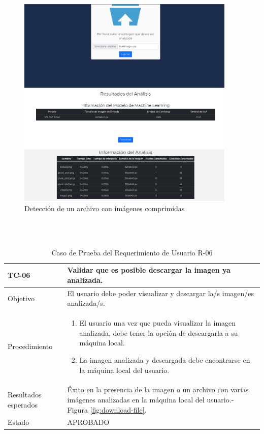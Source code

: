 \begin{figure}[h!]
    \centering
    \includegraphics[width=0.93\textwidth]{img/FE - bulk detection.png}
    \caption{Detección de un archivo con imágenes comprimidas}
    \label{fig:bulk-detection}
\end{figure}

\hfill \break
\\

\hfill \break
\\

\begin{table}[h!]
    \begin{tabular}{ | p{3cm} |p{9cm}| }
        \hline
        \rowcolor[HTML]{d6d8ff}
        TC-06 & Validar que es posible descargar la imagen ya analizada.\\
        \hline
        Objetivo & El usuario debe poder visualizar y descargar la/s imagen/es analizada/s.\\
        \hline
        Procedimiento & \begin{enumerate}
            \item El usuario una vez que pueda visualizar la imagen analizada, debe tener la opción de descargarla a su máquina local.
            \item La imagen analizada y descargada debe encontrarse en la máquina local del usuario.
        \end{enumerate}
        \\
        \hline
        Resultados esperados & Éxito en la presencia de la imagen o un archivo con varias imágenes analizadas en la máquina local del usuario.-  Figura \ref{fig:download-file}.\\
        \hline
        Estado & APROBADO \\
        \hline
    \end{tabular}\\
    \caption{Caso de Prueba del Requerimiento de Usuario R-06}
    \label{pruebar6}
\end{table}

